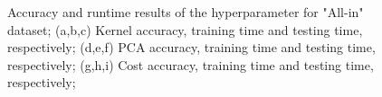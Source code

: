 \documentclass[conference]{IEEEtran}
\begin{document}
\begin{figure}[ht!]
    \quad
    \quad
    \quad

    \caption{
        \color{maxim}
        Accuracy and runtime results of the hyperparameter for "All-in" dataset; (a,b,c) Kernel accuracy, training time and testing time, respectively; (d,e,f) PCA accuracy, training time and testing time, respectively; (g,h,i) Cost accuracy, training time and testing time, respectively;
    }
    \label{fig:hyper:svm_param_allin}
\end{figure}
\end{document}
